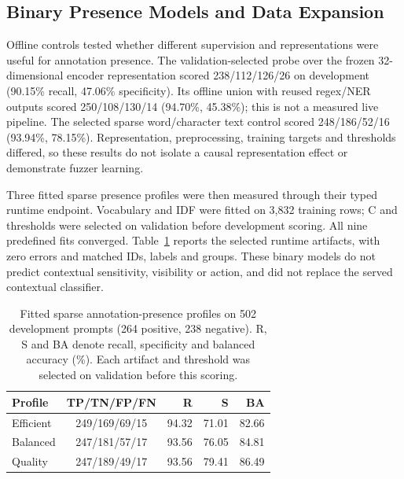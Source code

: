 \documentclass[conference]{IEEEtran}
\begin{document}
\subsection{Binary Presence Models and Data Expansion}

Offline controls tested whether different supervision and representations were useful for annotation presence. The validation-selected probe over the frozen 32-dimensional encoder representation scored 238/112/126/26 on development (90.15\% recall, 47.06\% specificity). Its offline union with reused regex/NER outputs scored 250/108/130/14 (94.70\%, 45.38\%); this is not a measured live pipeline. The selected sparse word/character text control scored 248/186/52/16 (93.94\%, 78.15\%). Representation, preprocessing, training targets and thresholds differed, so these results do not isolate a causal representation effect or demonstrate fuzzer learning.

Three fitted sparse presence profiles were then measured through their typed runtime endpoint. Vocabulary and IDF were fitted on 3,832 training rows; C and thresholds were selected on validation before development scoring. All nine predefined fits converged. Table~\ref{tab:presence_results} reports the selected runtime artifacts, with zero errors and matched IDs, labels and groups. These binary models do not predict contextual sensitivity, visibility or action, and did not replace the served contextual classifier.

\begin{table}[t]
\centering
\caption{Fitted sparse annotation-presence profiles on 502 development prompts (264 positive, 238 negative). R, S and BA denote recall, specificity and balanced accuracy (\%). Each artifact and threshold was selected on validation before this scoring.}
\label{tab:presence_results}
\small
\setlength{\tabcolsep}{4pt}
\begin{tabular}{lcrrr}
\hline
Profile & TP/TN/FP/FN & R & S & BA \\
\hline
Efficient & 249/169/69/15 & 94.32 & 71.01 & 82.66 \\
Balanced & 247/181/57/17 & 93.56 & 76.05 & 84.81 \\
Quality & 247/189/49/17 & 93.56 & 79.41 & 86.49 \\
\hline
\end{tabular}
\end{table}
\end{document}
